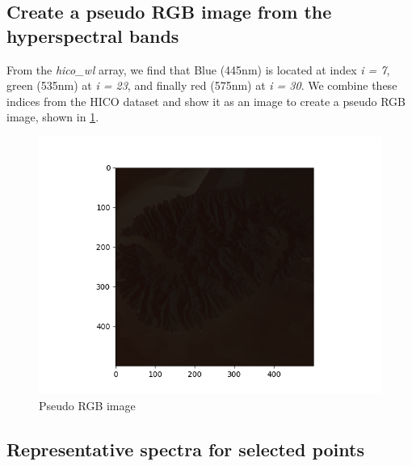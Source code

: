 \subsection{Create a pseudo RGB image from the hyperspectral bands}

From the \textit{hico\_wl} array, we find that Blue (445nm) is located at index \textit{i = 7}, 
green (535nm) at \textit{i = 23}, and finally red (575nm) at \textit{i = 30}. We combine these indices from 
the HICO dataset and show it as an image to create a pseudo RGB image, shown in \cref{fig:pseudo_rgb}.


\begin{figure}
    \centering
    \includegraphics[width=\textwidth]{../fig/pseudo_rgb.png}
    \caption{Pseudo RGB image}
    \label{fig:pseudo_rgb}
\end{figure}

\subsection{Representative spectra for selected points}
